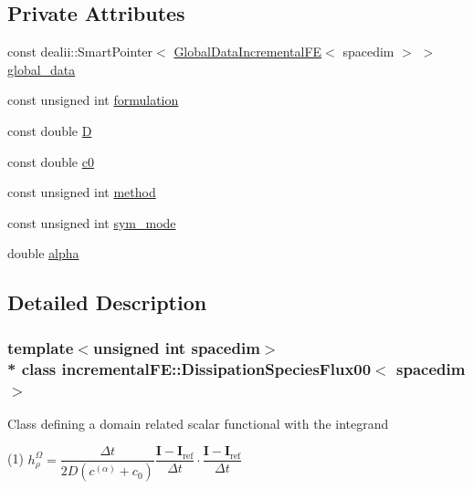 \subsection*{Private Attributes}
\begin{DoxyCompactItemize}
\item 
const dealii\+::\+Smart\+Pointer$<$ \hyperlink{classincremental_f_e_1_1_global_data_incremental_f_e}{Global\+Data\+Incremental\+FE}$<$ spacedim $>$ $>$ \hyperlink{classincremental_f_e_1_1_dissipation_species_flux00_a65f9537f13becd5ee6dfaf597e4e5710}{global\+\_\+data}
\item 
const unsigned int \hyperlink{classincremental_f_e_1_1_dissipation_species_flux00_ab25397ec84afda11b60fbe5791a7854b}{formulation}
\item 
const double \hyperlink{classincremental_f_e_1_1_dissipation_species_flux00_aeb62c376743048a919a6d1df5da62677}{D}
\item 
const double \hyperlink{classincremental_f_e_1_1_dissipation_species_flux00_a273359d9f5f84374f853a16b95ad7abb}{c0}
\item 
const unsigned int \hyperlink{classincremental_f_e_1_1_dissipation_species_flux00_ace59a69f460f6d0da34579b58b0b53d6}{method}
\item 
const unsigned int \hyperlink{classincremental_f_e_1_1_dissipation_species_flux00_ab16196704d97ae4a31dfd14a03338d19}{sym\+\_\+mode}
\item 
double \hyperlink{classincremental_f_e_1_1_dissipation_species_flux00_a794d510401280099eb0100d4e8d1a040}{alpha}
\end{DoxyCompactItemize}


\subsection{Detailed Description}
\subsubsection*{template$<$unsigned int spacedim$>$\\*
class incremental\+F\+E\+::\+Dissipation\+Species\+Flux00$<$ spacedim $>$}

Class defining a domain related scalar functional with the integrand

(1) $h^\Omega_\rho = \dfrac{\Delta t}{2 D ( c^{(\alpha)} + c_0 ) } \dfrac{\boldsymbol{I}-\boldsymbol{I}_\mathrm{ref}}{\Delta t} \cdot \dfrac{\boldsymbol{I}-\boldsymbol{I}_\mathrm{ref}}{\Delta t}$

